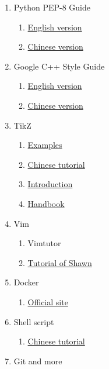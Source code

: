 \documentclass[12pt, a4paper]{article}
\begin{document}
\begin{enumerate}
  \item Python PEP-8 Guide
    \begin{enumerate}
      \item \href{https://www.python.org/dev/peps/pep-0008/}{English version}
      \item \href{http://blog.csdn.net/jmilk/article/details/53996580}{Chinese version}
    \end{enumerate}
  \item Google C++ Style Guide
    \begin{enumerate}
      \item \href{https://google.github.io/styleguide/cppguide.html}{English version}
      \item \href{https://zh-google-styleguide.readthedocs.io/en/latest/}{Chinese version}
    \end{enumerate}
  \item TikZ
    \begin{enumerate}
      \item \href{http://www.texample.net/tikz/}{Examples}
      \item \href{http://www.latexstudio.net/archives/9774}{Chinese tutorial}
      \item \href{http://cremeronline.com/LaTeX/minimaltikz.pdf}{Introduction}
      \item \href{https://drive.google.com/file/d/1jRvIUAgwbIVo7Cf2cnyOdVzYMv7_K4Tc/view?usp=sharing}{Handbook}
    \end{enumerate}
  \item Vim
    \begin{enumerate}
      \item Vimtutor
      \item \href{https://github.com/shawncplus/vim-classes}{Tutorial of Shawn}
    \end{enumerate}
  \item Docker
    \begin{enumerate}
      \item \href{https://docs.docker.com/}{Official site} 
    \end{enumerate}
  \item Shell script
    \begin{enumerate}
      \item \href{http://www.runoob.com/linux/linux-shell.html}{Chinese tutorial}
    \end{enumerate}
  \item Git and more
    \begin{enumerate}

\end{enumerate}
\end{enumerate}
\end{document}
